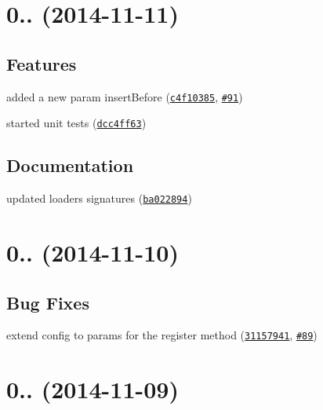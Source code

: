 \label{_0.5.0}%
 \section*{0.. (2014-\/11-\/11)}

\subsection*{Features}


\begin{DoxyItemize}
\item added a new param {\ttfamily insert\+Before} (\href{https://github.com/ocombe/ocLazyLoad/commit/c4f10385cb6a9122c3a03d28b1bb6837710cc3f7}{\tt c4f10385}, \href{https://github.com/ocombe/ocLazyLoad/issues/91}{\tt \#91})
\item started unit tests (\href{https://github.com/ocombe/ocLazyLoad/commit/dcc4ff639df23a1b934899b020a483e47e6ab290}{\tt dcc4ff63})
\end{DoxyItemize}

\subsection*{Documentation}


\begin{DoxyItemize}
\item updated loaders signatures (\href{https://github.com/ocombe/ocLazyLoad/commit/ba022894841222989cf699f07fe21f04f7ad3307}{\tt ba022894})
\end{DoxyItemize}

\label{_0.4.2}%
 \section*{0.. (2014-\/11-\/10)}

\subsection*{Bug Fixes}


\begin{DoxyItemize}
\item extend config to params for the register method (\href{https://github.com/ocombe/ocLazyLoad/commit/31157941ccabfa8f8c55edc00dc2b5758bf073b2}{\tt 31157941}, \href{https://github.com/ocombe/ocLazyLoad/issues/89}{\tt \#89})
\end{DoxyItemize}

\label{_0.4.1}%
 \section*{0.. (2014-\/11-\/09)}

